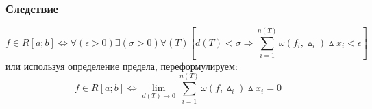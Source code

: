 \subsubsection{Следствие}
$$
f\in R[a;b]\Leftrightarrow \forall(\epsilon>0)\exists(\sigma>0)\forall(T)[d(T)<\sigma \Rightarrow \sum_{i=1}^{n(T)}\omega(f_i,\vartriangle_i)\vartriangle x_i < \epsilon]
$$
или используя определение предела, переформулируем:
$$
f \in R[a;b] \Leftrightarrow \lim_{d(T) \to 0} \sum_{i=1}^{n(T)}\omega(f,\vartriangle_i)\vartriangle x_i = 0
$$


